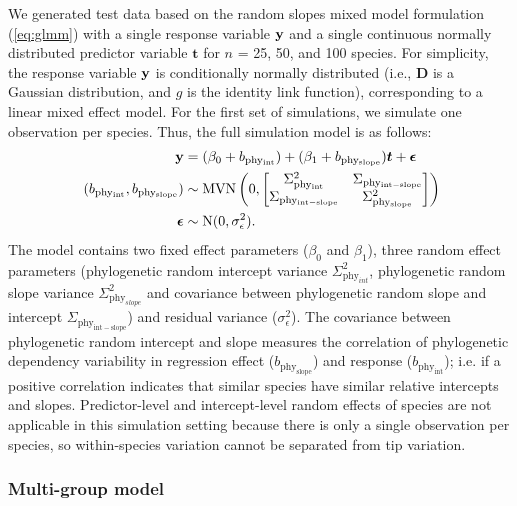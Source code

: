 \documentclass[12pt]{article}
\begin{document}
We generated test data based on the random slopes mixed model formulation (\ref{eq:glmm}) with a single response variable ${\mathbf y}$ and a single continuous normally distributed predictor variable $\bm{t}$ for $n$ = 25, 50, and 100 species.
For simplicity, the response variable ${\mathbf y}$ is conditionally normally distributed (i.e., $\bm{D}$ is a Gaussian distribution, and $g$ is the identity link function), corresponding to a linear mixed effect model. 
For the first set of simulations, we simulate one observation per species.
Thus, the full simulation model is as follows:
\begin{equation}
\begin{aligned}
{\mathbf y} & = (\beta_0 + b_{\mathrm{phy_{int}}}) + (\beta_1 + b_{\mathrm{phy_{slope}}}) \bm{t} + {\boldsymbol \epsilon} \\\
(b_{\mathrm{phy_{int}}}, b_{\mathrm{phy_{slope}}}) & \sim \textrm{MVN} \left( 0, \begin{bmatrix}
\Sigma^2_{\mathrm{phy_{int}}} & \Sigma_{\mathrm{phy_{int-slope}}} \\ 
\Sigma_{\mathrm{phy_{int-slope}}} & \Sigma^2_{\mathrm{phy_{slope}}}
\end{bmatrix} 
\right) \\ 
{\boldsymbol \epsilon} & \sim \textrm{N} ( 0 , \sigma_{\epsilon}^2) .
\label{eq:single_glmm}
\end{aligned}
\end{equation}
The model contains two fixed effect parameters ($\beta_0$ and $\beta_1$), three random effect parameters (phylogenetic random intercept variance $\Sigma^2_{\mathrm{phy}_{int}}$, phylogenetic random slope variance $\Sigma^2_{\mathrm{phy}_{slope}}$ and covariance between phylogenetic random slope and intercept $\Sigma_{\mathrm{phy_{int-slope}}}$) and residual variance ($\sigma_{\epsilon}^2$).  
The covariance between phylogenetic random intercept and slope measures the correlation of phylogenetic dependency variability in regression effect ($b_{\mathrm{phy_{slope}}}$) and response ($b_{\mathrm{phy_{int}}}$); i.e. if a positive correlation indicates that similar species have similar relative intercepts and slopes.
Predictor-level and intercept-level random effects of species are not applicable in this simulation setting because there is only a single observation per species, so within-species variation cannot be separated from tip variation.

\subsubsection*{Multi-group model}
\end{document}
